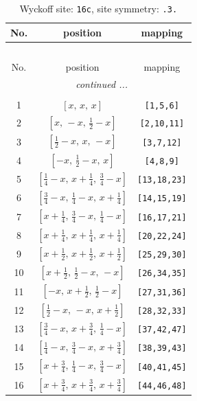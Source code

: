 \documentclass[fleqn,8pt]{jsarticle}
\begin{document}
\begin{longtable}{ccc}
\caption{Wyckoff site: {\tt 16c}, site symmetry: {\tt .3.}}
 \\
 \hline \hline
No. & position & mapping \\ \hline \endfirsthead

\multicolumn{2}{l}{\tablename\ \thetable{}} \\
 \hline \hline
No. & position & mapping \\ \hline \endhead

 \hline \hline
\multicolumn{2}{r}{\footnotesize\it continued ...} \\ \endfoot

 \hline \hline
\multicolumn{2}{r}{} \\ \endlastfoot

1 & $\left[ x,\, x,\, x \right]$ & {\tt [1,5,6]} \\ \hline
2 & $\left[ x,\, - x,\, \frac{1}{2} - x \right]$ & {\tt [2,10,11]} \\ \hline
3 & $\left[ \frac{1}{2} - x,\, x,\, - x \right]$ & {\tt [3,7,12]} \\ \hline
4 & $\left[ - x,\, \frac{1}{2} - x,\, x \right]$ & {\tt [4,8,9]} \\ \hline
5 & $\left[ \frac{1}{4} - x,\, x + \frac{1}{4},\, \frac{3}{4} - x \right]$ & {\tt [13,18,23]} \\ \hline
6 & $\left[ \frac{3}{4} - x,\, \frac{1}{4} - x,\, x + \frac{1}{4} \right]$ & {\tt [14,15,19]} \\ \hline
7 & $\left[ x + \frac{1}{4},\, \frac{3}{4} - x,\, \frac{1}{4} - x \right]$ & {\tt [16,17,21]} \\ \hline
8 & $\left[ x + \frac{1}{4},\, x + \frac{1}{4},\, x + \frac{1}{4} \right]$ & {\tt [20,22,24]} \\ \hline
9 & $\left[ x + \frac{1}{2},\, x + \frac{1}{2},\, x + \frac{1}{2} \right]$ & {\tt [25,29,30]} \\ \hline
10 & $\left[ x + \frac{1}{2},\, \frac{1}{2} - x,\, - x \right]$ & {\tt [26,34,35]} \\ \hline
11 & $\left[ - x,\, x + \frac{1}{2},\, \frac{1}{2} - x \right]$ & {\tt [27,31,36]} \\ \hline
12 & $\left[ \frac{1}{2} - x,\, - x,\, x + \frac{1}{2} \right]$ & {\tt [28,32,33]} \\ \hline
13 & $\left[ \frac{3}{4} - x,\, x + \frac{3}{4},\, \frac{1}{4} - x \right]$ & {\tt [37,42,47]} \\ \hline
14 & $\left[ \frac{1}{4} - x,\, \frac{3}{4} - x,\, x + \frac{3}{4} \right]$ & {\tt [38,39,43]} \\ \hline
15 & $\left[ x + \frac{3}{4},\, \frac{1}{4} - x,\, \frac{3}{4} - x \right]$ & {\tt [40,41,45]} \\ \hline
16 & $\left[ x + \frac{3}{4},\, x + \frac{3}{4},\, x + \frac{3}{4} \right]$ & {\tt [44,46,48]} \\
\end{longtable}
\end{document}
